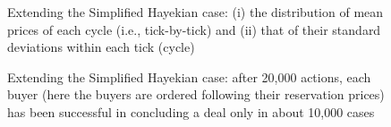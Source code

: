 \documentclass[10pt]{report}
\begin{document}
\begin{appendices}
\begin{figure}[H]
\begin{center}
\caption{Extending the Simplified Hayekian case: (i) the distribution of mean prices of each cycle (i.e., tick-by-tick) and (ii) that of their standard deviations within each tick (cycle)}
\label{output_3_3B2.png}
\end{center}
\end{figure}

\begin{figure}[H]
\begin{center}
\caption{Extending the Simplified Hayekian case: after 20,000 actions, each buyer (here the buyers are ordered  following their reservation prices) has been successful in concluding a deal only in about 10,000 cases}
\label{output_4_0B2.png}
\end{center}
\end{figure}


\end{appendices}
\end{document}
